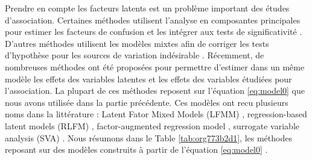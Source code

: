 \documentclass[12pt,a4paper,twoside]{ugathesis}
\begin{document}
Prendre en compte les facteurs latents est un problème important des études
d'association. Certaines méthodes utilisent l'analyse en composantes principales
pour estimer les facteurs de confusion et les intégrer aux tests de
significativité \citep{Rahmani_2016,Price_2006}. D'autres méthodes utilisent les
modèles mixtes afin de corriger les tests d'hypothèse pour les sources de
variation indésirable \citep{Kang_2008,Zhou_2014,Loh194944}. Récemment, de
nombreuses méthodes ont été proposées pour permettre d'estimer dans un même
modèle les effets des variables latentes et les effets des variables étudiées
pour l'association. La plupart de ces méthodes reposent sur l'équation
\eqref{eq:model0} que nous avons utilisée dans la partie précédente. Ces modèles
ont recu plusieurs noms dans la littérature : Latent Fator Mixed Models (LFMM)
\citep{Frichot_2013}, regression-based latent models (RLFM)
\citep{agarwal09_regres}, factor-augmented regression model
\cite{gerard2017empirical}, surrogate variable analysis (SVA)
\cite{article_Leek_Storey_2007}. Nous résumons dans le Table
\ref{tab:org773b2d1}, les méthodes reposant sur des modèles construits à
partir de l'équation \eqref{eq:model0} .
\end{document}
